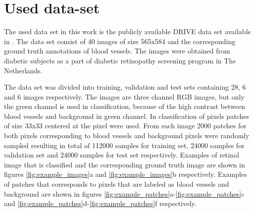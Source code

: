 \documentclass[aps,prb,10pt,twocolumn,groupedaddress]{revtex4-1}
\begin{document}
\section{Used data-set}
\label{sec:used_data_set}
The used data set in this work is the publicly available DRIVE data set \cite{staal} available in \cite{driveurl}. The data set consist of 40 images of size 565x584 and the corresponding ground truth annotations of blood vessels. The images were obtained from diabetic subjects as a part of diabetic retinopathy screening program in The Netherlands.

The data set was divided into training, validation and test sets containing 28, 6 and 6 images respectively. The images are three channel RGB images, but only the green channel is used in classification, because of the high contrast between blood vessels and background in green channel\cite{green_contrast}. In classification of pixels patches of size 33x33 centered at the pixel were used. From each image 2000 patches for both pixels corresponding to blood vessels and background pixels were randomly sampled resulting in total of 112000 samples for training set, 24000 samples for validation set and 24000 samples for test set respectively. Examples of retinal image that is classified and the corresponding ground truth image are shown in figures \ref{fig:example_images}a and \ref{fig:example_images}b respectively. Examples of patches that corresponds to pixels that are labeled as blood vessels and background are shown in figures \ref{fig:example_patches}a-\ref{fig:example_patches}c and \ref{fig:example_patches}d-\ref{fig:example_patches}f respectively.
\end{document}
